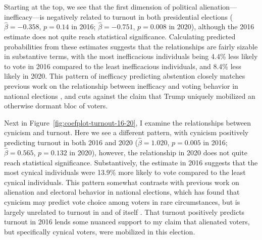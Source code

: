 \documentclass[12pt]{article}
\begin{document}
Starting at the top, we see that the first dimension of political alienation---inefficacy---is negatively related to turnout in both presidential elections ($\hat{\beta} = -0.358$, $p = 0.14$ in 2016; $\hat{\beta} = -0.751$, $p = 0.008$ in 2020), although the 2016 estimate does not quite reach statistical significance. Calculating predicted probabilities from these estimates suggests that the relationships are fairly sizable in substantive terms, with the most inefficacious individuals being 4.4\% less likely to vote in 2016 compared to the least inefficacious individuals, and 8.4\% less likely in 2020. This pattern of inefficacy predicting abstention closely matches previous work on the relationship between inefficacy and voting behavior in national elections \parencite[e.g.,][]{aberbach1969alienation,southwell1998electoral}, and cuts against the claim that Trump uniquely mobilized an otherwise dormant bloc of voters. 

Next in Figure~\ref{fig:coefplot-turnout-16-20}, I examine the relationships between cynicism and turnout. Here we see a different pattern, with cynicism positively predicting turnout in both 2016 and 2020 ($\hat{\beta} = 1.020 $, $p = 0.005$ in 2016; $\hat{\beta} = 0.565$, $p = 0.132$ in 2020), however, the relationship in 2020 does not quite reach statistical significance. Substantively, the estimate in 2016 suggests that the most cynical individuals were 13.9\% more likely to vote compared to the least cynical individuals. This pattern somewhat contrasts with previous work on alienation and electoral behavior in national elections, which has found that cynicism may predict vote choice among voters in rare circumstances, but is largely unrelated to turnout in and of itself \parencite{southwell1998electoral}. That turnout positively predicts turnout in 2016 lends some nuanced support to my claim that alienated voters, but specifically cynical voters, were mobilized in this election.  
\end{document}
